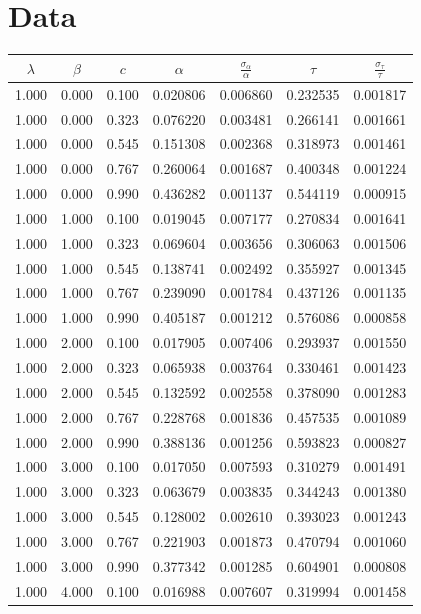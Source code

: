\documentclass{article}
\newcommand{\albedo}{\alpha}
\newcommand{\transmission}{\tau}
\begin{document}
\section{Data}
  \label{sec:data}
  \begin{longtable}{ccccccc}
    \toprule
    $\lambda$ & $\beta$ & $c$ & $\albedo$ &
    $\frac{\sigma_{\albedo}}{\albedo}$ &
    $\transmission$ & $\frac{\sigma_{\transmission}}{\transmission}$ \\
    \midrule
    1.000& 0.000& 0.100&0.020806&0.006860&0.232535&0.001817\\
    1.000& 0.000& 0.323&0.076220&0.003481&0.266141&0.001661\\
    1.000& 0.000& 0.545&0.151308&0.002368&0.318973&0.001461\\
    1.000& 0.000& 0.767&0.260064&0.001687&0.400348&0.001224\\
    1.000& 0.000& 0.990&0.436282&0.001137&0.544119&0.000915\\
    1.000& 1.000& 0.100&0.019045&0.007177&0.270834&0.001641\\
    1.000& 1.000& 0.323&0.069604&0.003656&0.306063&0.001506\\
    1.000& 1.000& 0.545&0.138741&0.002492&0.355927&0.001345\\
    1.000& 1.000& 0.767&0.239090&0.001784&0.437126&0.001135\\
    1.000& 1.000& 0.990&0.405187&0.001212&0.576086&0.000858\\
    1.000& 2.000& 0.100&0.017905&0.007406&0.293937&0.001550\\
    1.000& 2.000& 0.323&0.065938&0.003764&0.330461&0.001423\\
    1.000& 2.000& 0.545&0.132592&0.002558&0.378090&0.001283\\
    1.000& 2.000& 0.767&0.228768&0.001836&0.457535&0.001089\\
    1.000& 2.000& 0.990&0.388136&0.001256&0.593823&0.000827\\
    1.000& 3.000& 0.100&0.017050&0.007593&0.310279&0.001491\\
    1.000& 3.000& 0.323&0.063679&0.003835&0.344243&0.001380\\
    1.000& 3.000& 0.545&0.128002&0.002610&0.393023&0.001243\\
    1.000& 3.000& 0.767&0.221903&0.001873&0.470794&0.001060\\
    1.000& 3.000& 0.990&0.377342&0.001285&0.604901&0.000808\\
    1.000& 4.000& 0.100&0.016988&0.007607&0.319994&0.001458\\

\end{longtable}
\end{document}
